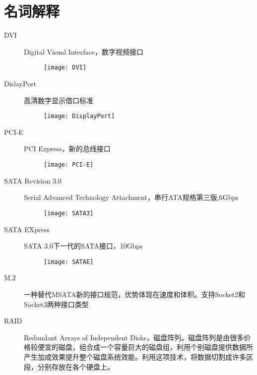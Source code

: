 \section{名词解释}
\begin{description}

\item[DVI] Digital Visual Interface，数字视频接口
\begin{figure}[!h]
\centering
\texttt{[image: DVI]}
\end{figure}

\item[DislayPort] 高清数字显示借口标准
\begin{figure}[!ht]
\centering
\texttt{[image: DisplayPort]}
\end{figure}

\item[PCI-E] PCI Express，新的总线接口
\begin{figure}[!ht]
\centering
\texttt{[image: PCI-E]}
\end{figure}

\item[SATA Revision 3.0] Serial Advanced Technology Attachment，串行ATA规格第三版,6Gbps
\begin{figure}[!ht]
\centering
\texttt{[image: SATA3]}
\end{figure}

\item[SATA EXpress] SATA 3.0下一代的SATA接口，10Gbps
\begin{figure}[!ht]
\centering
\texttt{[image: SATAE]}
\end{figure}

\item[M.2] 一种替代MSATA新的接口规范，优势体现在速度和体积。支持Socket2和Socket3两种接口类型
\begin{figure}[!ht]
  \centering 
  \subfigure[]{ 
    \texttt{[image: M2]}} 
  \caption{}
\end{figure}

\item[RAID] Redundant Arrays of Independent Disks，磁盘阵列。磁盘阵列是由很多价格较便宜的磁盘，组合成一个容量巨大的磁盘组，利用个别磁盘提供数据所产生加成效果提升整个磁盘系统效能。利用这项技术，将数据切割成许多区段，分别存放在各个硬盘上。
\begin{figure}[!ht]
  \centering 
  \caption{}
\end{figure}


\end{description}
